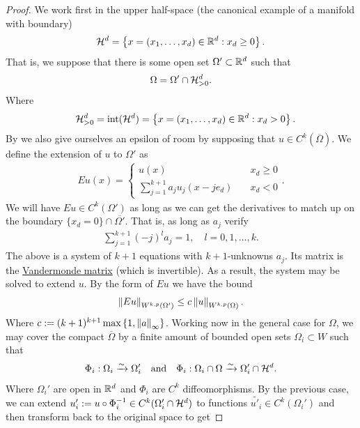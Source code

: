 \documentclass[
    a4paper,
    DIV=14,
    abstract=true,
    numbers=noenddot
]{scrartcl}
\begin{document}
\begin{proof}
	We work first in the upper half-space (the canonical example of a manifold with boundary)
	\begin{align*}
		\mathcal{H}^d =\left\{x=(x_1,\ldots,x_d) \in \mathbb{R}^d : x_d \geq 0\right\} .
	\end{align*}
	That is, we suppose that there is some open set $\Omega' \subset  \mathbb{R}^d$ such that
	\begin{align*}
		\Omega=\Omega' \cap \mathcal{H}^d_{>0}.
	\end{align*}
	Where
	\begin{align*}
		\quad \mathcal{H}^d_{>0} =\mathrm{int}(\mathcal{H}^d)=\left\{x=(x_1,\ldots,x_d) \in \mathbb{R}^d : x_d >0\right\} .
	\end{align*}
	By  we also give ourselves an epsilon of room by supposing that $u \in C^k(\overline{\Omega})$. We define the extension of $u$ to $\Omega'$ as
	\begin{align*}
		Eu(x) = \begin{cases}
			        u(x) \quad                                 & x_{d}                                 \geq 0      \\
			        \sum_{j=1}^{k+1} a_j  u_j(x - j e_d) \quad & x_d                                           < 0
		        \end{cases}.
	\end{align*}
	We will have $Eu \in C^k(\Omega')$ as long as we can get the derivatives to match up on the boundary $\{x_d=0\}\cap \overline{\Omega'}$. That is,  as long as $a_j$ verify
	\begin{align*}
		\sum_{j=1}^{k+1}(-j)^l a_j =1 , \quad l=0,1,\ldots,k .
	\end{align*}
	The above is a system of $k+1$ equations with $k+1$-unknowns $a_j$. Its matrix is the \href{https://en.wikipedia.org/wiki/Vandermonde_matrix}{Vandermonde matrix} (which is invertible). As a result, the system may be solved to extend $u$. By the form of $Eu$ we have the bound
	\begin{align*}
		\left\lVert Eu \right\rVert_{W^{k,p}(\Omega')} \leq c\left\lVert u \right\rVert_{W^{k,p}(\Omega)} .
	\end{align*}
	Where $c:= (k+1)^{k+1}\max \left\{1,\left\lVert a \right\rVert_\infty\right\}$. Working now in the general case for $\Omega$, we may cover the compact $\overline{\Omega}$ by a finite amount of bounded open sets $\Omega_i \subset W$ such that
	\begin{align*}
		\Phi_i : \Omega_i \xrightarrow{\sim} \Omega_i'\quad \text{and}  \quad \Phi_i : \Omega_i \cap \Omega \xrightarrow{\sim} \Omega_i' \cap \mathcal{H}^d .
	\end{align*}
	Where $\Omega_i'$ are open in  $\mathbb{R}^{d}$ and $\Phi_i$ are $C^k$ diffeomorphisms. By the previous case, we can extend  $u'_i:=u \circ \Phi_i^{-1} \in C^k (\Omega_i' \cap \mathcal{H}^d)$ to functions $\widetilde{u'_i} \in C^k(\Omega_i')$ and then transform back to the original space to get

\end{proof}
\end{document}
